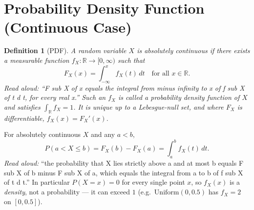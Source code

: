 \documentclass[11pt]{article}
\newtheorem{definition}{Definition}
\begin{document}
\section{Probability Density Function (Continuous Case)}

\begin{definition}[PDF]
A random variable $X$ is \emph{absolutely continuous} if there exists a measurable function $f_X : \mathbb{R} \to [0, \infty)$ such that
\[
F_X(x) = \int_{-\infty}^{x} f_X(t) \, dt \quad \text{for all } x \in \mathbb{R}.
\]
\emph{Read aloud:} ``F sub X of x equals the integral from minus infinity to x of f sub X of t d t, for every real x.''
Such an $f_X$ is called a \emph{probability density function} of $X$ and satisfies $\int_{\mathbb{R}} f_X = 1$. It is unique up to a Lebesgue-null set, and where $F_X$ is differentiable, $f_X(x) = F_X'(x)$.
\end{definition}

For absolutely continuous $X$ and any $a < b$,
\[
P(a < X \le b) = F_X(b) - F_X(a) = \int_a^b f_X(t)\, dt.
\]
\emph{Read aloud:} ``the probability that X lies strictly above a and at most b equals F sub X of b minus F sub X of a, which equals the integral from a to b of f sub X of t d t.''
In particular $P(X = x) = 0$ for every single point $x$, so $f_X(x)$ is a \emph{density}, not a probability --- it can exceed $1$ (e.g.\ $\mathrm{Uniform}(0, 0.5)$ has $f_X = 2$ on $[0, 0.5]$).
\end{document}
